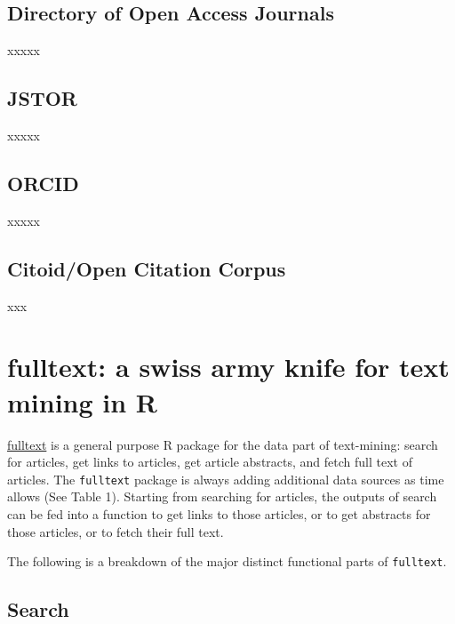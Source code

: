 \documentclass[author-year, review, 11pt]{components/elsarticle} %
\begin{document}
\hypertarget{directory-of-open-access-journals}{%
\subsection{Directory of Open Access
Journals}\label{directory-of-open-access-journals}}

xxxxx

\hypertarget{jstor}{%
\subsection{JSTOR}\label{jstor}}

xxxxx

\hypertarget{orcid}{%
\subsection{ORCID}\label{orcid}}

xxxxx

\hypertarget{citoidopen-citation-corpus}{%
\subsection{Citoid/Open Citation
Corpus}\label{citoidopen-citation-corpus}}

xxx

\hypertarget{fulltext-a-swiss-army-knife-for-text-mining-in-r}{%
\section{fulltext: a swiss army knife for text mining in
R}\label{fulltext-a-swiss-army-knife-for-text-mining-in-r}}

\href{https://github.com/ropensci/fulltext}{fulltext} is a general
purpose R package for the data part of text-mining: search for articles,
get links to articles, get article abstracts, and fetch full text of
articles. The \texttt{fulltext} package is always adding additional data
sources as time allows (See Table 1). Starting from searching for
articles, the outputs of search can be fed into a function to get links
to those articles, or to get abstracts for those articles, or to fetch
their full text.

The following is a breakdown of the major distinct functional parts of
\texttt{fulltext}.

\hypertarget{search}{%
\subsection{Search}\label{search}}
\end{document}
